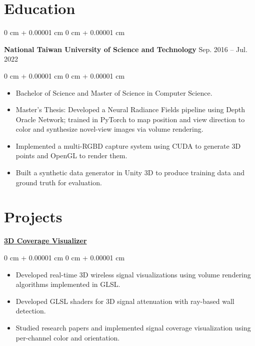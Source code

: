 \documentclass[10pt, letterpaper]{article}
\newenvironment{highlights}{
    \begin{itemize}[
        topsep=0.10 cm,
        parsep=0.10 cm,
        partopsep=0pt,
        itemsep=0pt,
        leftmargin=0 cm + 10pt
    ]
}{
    \end{itemize}
} %
\newenvironment{onecolentry}{
    \begin{adjustwidth}{
        0 cm + 0.00001 cm
    }{
        0 cm + 0.00001 cm
    }
}{
    \end{adjustwidth}
} %
\newenvironment{twocolentry}[2][]{
    \onecolentry
    \def\secondColumn{#2}
    \setcolumnwidth{\fill, 4.5 cm}
    \begin{paracol}{2}
}{
    \switchcolumn \raggedleft \secondColumn
    \end{paracol}
    \endonecolentry
} %
\begin{document}
    \section{Education}
    
     \begin{twocolentry}{
        Sep. 2016 – Jul. 2022
    }
        \textbf{National Taiwan University of Science and Technology}\end{twocolentry}
    
    
    \vspace{0.10 cm}
    \begin{onecolentry}
        \begin{highlights}
            \item Bachelor of Science and Master of Science in Computer Science.
            \item Master’s Thesis: Developed a Neural Radiance Fields pipeline using Depth Oracle Network; trained in PyTorch to map position and view direction to color and synthesize novel-view images via volume rendering.
            \item Implemented a multi-RGBD capture system using CUDA to generate 3D points and OpenGL to render them.
            \item Built a synthetic data generator in Unity 3D to produce training data and ground truth for evaluation.
        \end{highlights}
    \end{onecolentry}
    
    
    \section{Projects}
        \href{https://github.com/tsengyushiang/coverage-visualizer}{\textbf{3D Coverage Visualizer}}

        \vspace{0.10 cm}
        \begin{onecolentry}
            \begin{highlights}
                \item Developed real-time 3D wireless signal visualizations using volume rendering algorithms implemented in GLSL.
                \item Developed GLSL shaders for 3D signal attenuation with ray-based wall detection.
                \item Studied research papers and implemented signal coverage visualization using per-channel color and orientation.
            \end{highlights}
        \end{onecolentry}
\end{document}
